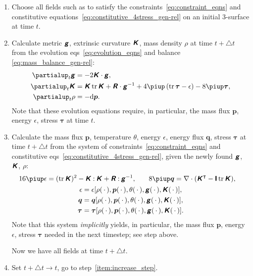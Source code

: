 \documentclass[\ifafour a4paper,12pt,\else a5paper,10pt,\fi%
onecolumn,oneside,article,%
british%
]{memoir}
\theoremstyle{remark}
\theoremstyle{innote}
\newcommand*{\mathte}[1]{\textbf{\textit{\textsf{#1}}}}
\newcommand*{\de}{\partialup}%
\newcommand*{\pu}{\piup}%
\newcommand*{\di}{\mathrm{d}}%
\DeclareMathOperator{\tr}{tr}%
\newcommand*{\incr}{\triangle}%
\newcommand*{\dotv}{\mathord{\,\cdot\,}}%
\newcommand*{\con}{\mathbin{:}}%
\renewcommand*{\|}{\nonscript\,\vert\nonscript\;\mathopen{}}
\newcommand*{\eqns}{eqs}%
\newcommand*{\T}{^\intercal}%
\newcommand*{\ydd}{\rho}
\newcommand*{\yd}{\ydd}
\newcommand*{\yjj}{p}
\newcommand*{\yj}{\bm{\yjj}}
\newcommand*{\yTT}{\tau}
\newcommand*{\yT}{\bm{\yTT}}
\newcommand*{\ygg}{g}
\newcommand*{\yg}{\mathte{\ygg}}
\newcommand*{\yKK}{K}
\newcommand*{\yK}{\mathte{\yKK}}
\newcommand*{\yRR}{R}
\newcommand*{\yR}{\mathte{\yRR}}
\newcommand*{\ypp}{q}
\newcommand*{\yp}{\bm{\ypp}}
\newcommand*{\ye}{\epsilon}
\newcommand*{\yte}{\theta}
\newcommand*{\ynab}{\nabla}
\newcommand*{\yto}{t}
\newcommand*{\yI}{\textsf{\textbf{I}}}
\begin{document}
\begin{enumerate}[leftmargin=1.5\parindent]
\item Choose all fields such as to satisfy the
  constraints~\eqref{eq:constraint_eqns} and constitutive
  equations~\eqref{eq:constitutive_4stress_gen-rel} on an initial 3-surface
  at time $\yto$.
\item\label{item:increase_step}Calculate metric $\yg$, extrinsic curvature
  $\yK$, mass density $\yd$ at time $\yto + \incr t$ from the evolution
  \eqns~\eqref{eq:evolution_eqns} and balance
  \eqref{eq:mass_balance_gen-rel}:
  \begin{align*}
    \de_t \yg &= -2\yK\cdot\yg,
    \\
    \de_t \yK &=  \yK\tr\yK + \yR\cdot\yg^{-1} + 4\pu\,(\tr\yT-\ye) - 8\pu\yT,
    \\
    \de_t\yd &= - \di\yj.
  \end{align*}
  Note that these evolution equations require, in particular, the mass flux
  $\yj$, energy $\ye$, stress $\yT$ at time $\yto$.
\item\label{item:increase_step_energy}Calculate the mass flux $\yj$,
  temperature $\yte$, energy $\ye$, energy flux $\yp$, stress $\yT$ at time
  $\yto + \incr t$ from the system of
  constraints~\eqref{eq:constraint_eqns} and constitutive
  \eqns~\eqref{eq:constitutive_4stress_gen-rel}, given the newly found
  $\yg$, $\yK$, $\yd$:
  \begin{gather*}
    \begin{aligned}
    16\pu\ye &= (\tr\yK)^2 - \yK\con\yK + \yR\con\yg^{-1},
    &\quad
      8\pu\yp &= \ynab\cdot(\yK\T - \yI\tr\yK),
    \end{aligned}\\
    \ye = \ye[\yd(\dotv),\yj(\dotv),\yte(\dotv),\yg(\dotv), \yK(\dotv)],
    \\
      \yp = \yp[\yd(\dotv),\yj(\dotv),\yte(\dotv),\yg(\dotv), \yK(\dotv)],
      \\
      \yT = \yT[\yd(\dotv),\yj(\dotv),\yte(\dotv),\yg(\dotv), \yK(\dotv)].
  \end{gather*}
  Note that this system \emph{implicitly} yields, in particular, the mass
  flux $\yj$, energy $\ye$, stress $\yT$ needed in the next timestep; see
  step above.

  Now we have all fields at time $\yto + \incr t$.

\item Set $\yto + \incr t \to \yto$, go to step~\ref{item:increase_step}.
\end{enumerate}
\end{document}
